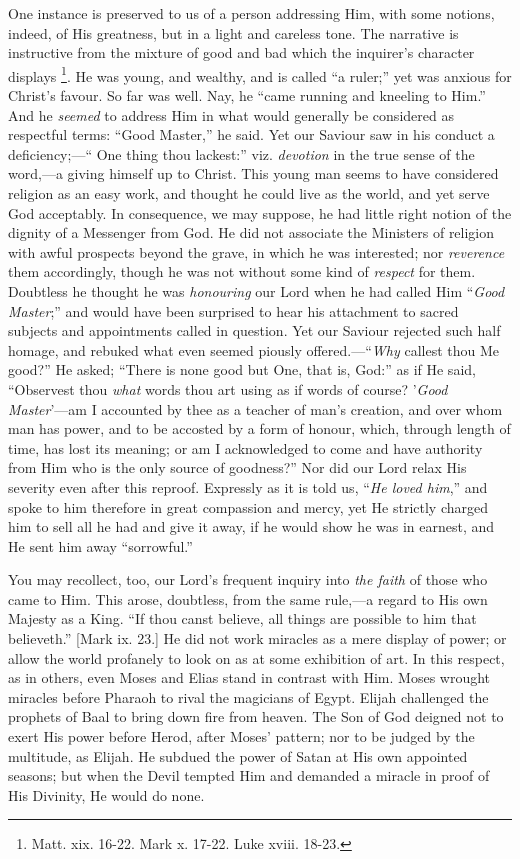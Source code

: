 One instance is preserved to us of a person addressing
Him, with some notions, indeed, of His greatness, but in
a light and careless tone. The narrative is instructive
from the mixture of good and bad which the inquirer's
character displays \footnote{Matt. xix. 16-22. Mark x. 17-22. Luke
xviii. 18-23.}. He was young, and wealthy, and is called
``a ruler;'' yet was anxious for Christ's favour.
So far was well. Nay, he ``came running and kneeling
to Him.'' And he \emph{seemed} to address Him in what
would generally be considered as respectful terms:
``Good Master,'' he said. Yet our Saviour saw in
his conduct a deficiency;—`` One thing thou
lackest:'' viz. \emph{devotion} in the true sense of
the word,—a giving himself up to Christ. This young
man seems to have considered religion as an easy work,
and thought he could live as the world, and yet serve God
acceptably. In consequence, we may suppose, he had little
right notion of the dignity of a Messenger from God. He
did not associate the Ministers of religion with awful
prospects beyond the grave, in which he was interested;
nor \emph{reverence} them accordingly, though he was not
without some kind of \emph{respect} for them. Doubtless
he thought he was \emph{honouring} our Lord when he had
called Him ``\emph{Good Master};'' and would have
been surprised to hear his attachment to sacred subjects
and appointments called in question. Yet our Saviour
rejected such half homage, and rebuked what even seemed
piously offered.—``\emph{Why} callest thou Me
good?'' He asked; ``There is none good but One,
that is, God:'' as if He said, ``Observest thou \emph{what}
words thou art using as if words of course? '\emph{Good
Master}'—am I accounted by thee as a teacher of
man's creation, and over whom man has power, and to be
accosted by a form of honour, which, through length of
time, has lost its meaning; or am I acknowledged to come
and have authority from Him who is the only source of
goodness?'' Nor did our Lord relax His severity even
after this reproof. Expressly as it is told us, ``\emph{He
loved him},'' and spoke to him therefore in great
compassion and mercy, yet He strictly charged him to sell
all he had and give it away, if he would show he was in
earnest, and He sent him away ``sorrowful.''

You may recollect, too, our Lord's frequent inquiry
into \emph{the faith} of those who came to Him. This
arose, doubtless, from the same rule,—a regard to
His own Majesty as a King. ``If thou canst believe,
all things are possible to him that believeth.''
[Mark ix. 23.] He did not work miracles as a mere display
of power; or allow the world profanely to look on as at
some exhibition of art. In this respect, as in others,
even Moses and Elias stand in contrast with Him. Moses
wrought miracles before Pharaoh to rival the magicians of
Egypt. Elijah challenged the prophets of Baal to bring
down fire from heaven. The Son of God deigned not to
exert His power before Herod, after Moses' pattern; nor
to be judged by the multitude, as Elijah. He subdued the
power of Satan at His own appointed seasons; but when the
Devil tempted Him and demanded a miracle in proof of His
Divinity, He would do none.

